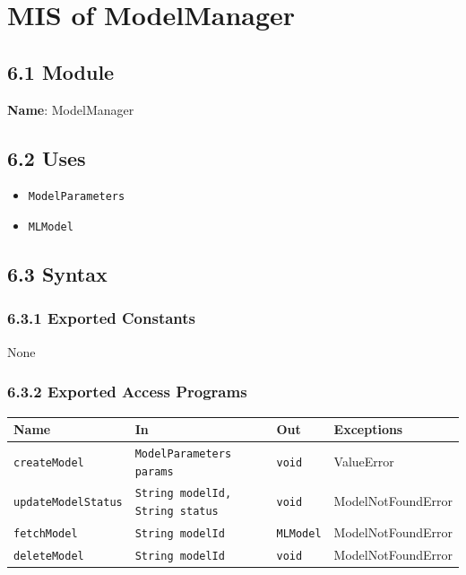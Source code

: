 \documentclass[12pt, titlepage]{article}
\begin{document}
\newpage


\section{MIS of ModelManager}
\label{sec:ModelManager}

\subsection{6.1 Module}
\textbf{Name}: ModelManager

\subsection{6.2 Uses}
\begin{itemize}
    \item \texttt{ModelParameters}
    \item \texttt{MLModel}
\end{itemize}

\subsection{6.3 Syntax}

\subsubsection{6.3.1 Exported Constants}
None

\subsubsection{6.3.2 Exported Access Programs}
\begin{center}
\begin{tabular}{p{3.5cm} p{4.5cm} p{4cm} p{3cm}}
\hline
\textbf{Name} & \textbf{In} & \textbf{Out} & \textbf{Exceptions} \\
\hline
\texttt{createModel} & \texttt{ModelParameters params} & \texttt{void} & ValueError \\
\hline
\texttt{updateModelStatus} & \texttt{String modelId, String status} & \texttt{void} & ModelNotFoundError \\
\hline
\texttt{fetchModel} & \texttt{String modelId} & \texttt{MLModel} & ModelNotFoundError \\
\hline
\texttt{deleteModel} & \texttt{String modelId} & \texttt{void} & ModelNotFoundError \\
\hline
\end{tabular}
\end{center}
\end{document}
